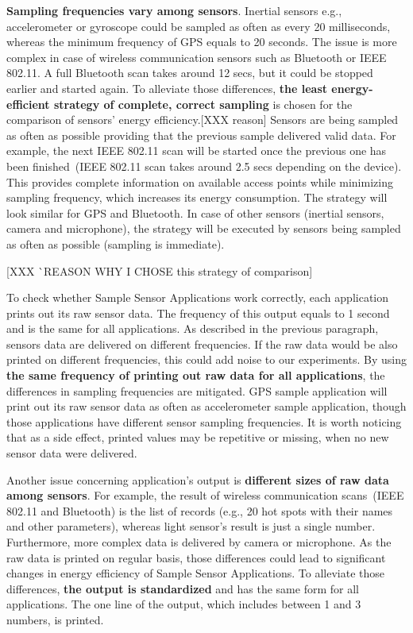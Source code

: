 \textbf{Sampling frequencies vary among sensors}. Inertial sensors e.g., accelerometer or gyroscope could be sampled as often as every 20 milliseconds, whereas the minimum frequency of GPS equals to 20 seconds. The issue is more complex in case of wireless communication sensors such as Bluetooth or IEEE 802.11. A full Bluetooth scan takes around 12 secs, but it could be stopped earlier and started again. To alleviate those differences, \textbf{the least energy-efficient strategy of complete, correct sampling} is chosen for the comparison of sensors' energy efficiency.[XXX reason] Sensors are being sampled as often as possible providing that the previous sample delivered valid data. For example, the next IEEE 802.11 scan will be started once the previous one has been finished\ (IEEE 802.11 scan takes around 2.5 secs depending on the device). This provides complete information on available access points while minimizing sampling frequency, which increases its energy consumption. The strategy will look similar for GPS and Bluetooth. In case of other sensors (inertial sensors, camera and microphone), the strategy will be executed by sensors being sampled as often as possible (sampling is immediate). 

[XXX ^^ REASON WHY I CHOSE this strategy of comparison]

To check whether Sample Sensor Applications work correctly, each application prints out its raw sensor data. The frequency of this output equals to 1 second and is the same for all applications. As described in the previous paragraph, sensors data are delivered on different frequencies. If the raw data would be also printed on different frequencies, this could add noise to our experiments. By using \textbf{the same frequency of printing out raw data for all applications}, the differences in sampling frequencies are mitigated. GPS sample application will print out its raw sensor data as often as accelerometer sample application, though those applications have different sensor sampling frequencies. It is worth noticing that as a side effect, printed values may be repetitive or missing, when no new sensor data were delivered. 

Another issue concerning application's output is \textbf{different sizes of raw data among sensors}. For example, the result of wireless communication scans\ (IEEE 802.11 and Bluetooth) is the list of records (e.g., 20 hot spots with their names and other parameters), whereas light sensor's result  is just a single number. Furthermore, more complex data is delivered by camera or microphone. As the raw data is printed on regular basis, those differences could lead to significant changes in energy efficiency of Sample Sensor Applications. To alleviate those differences, \textbf{the output is standardized} and has the same form for all applications. The one line of the output, which includes between 1 and 3 numbers, is printed.


